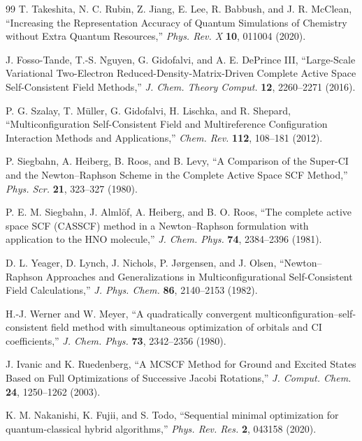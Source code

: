 \documentclass[
 reprint,
 amsmath,amssymb,
 aps,
 physrev,
]{revtex4-2}
\begin{document}
\begin{thebibliography}{99}
    T. Takeshita, N. C. Rubin, Z. Jiang, E. Lee, R. Babbush, and J. R. McClean,
    ``Increasing the Representation Accuracy of Quantum Simulations of Chemistry without Extra Quantum Resources,''
    \textit{Phys. Rev. X} \textbf{10}, 011004 (2020).

    J. Fosso-Tande, T.-S. Nguyen, G. Gidofalvi, and A. E. DePrince III,
    ``Large-Scale Variational Two-Electron Reduced-Density-Matrix-Driven Complete Active Space Self-Consistent Field Methods,''
    \textit{J. Chem. Theory Comput.} \textbf{12}, 2260--2271 (2016).

    P. G. Szalay, T. M{\"u}ller, G. Gidofalvi, H. Lischka, and R. Shepard,
    ``Multiconfiguration Self-Consistent Field and Multireference Configuration Interaction Methods and Applications,''
    \textit{Chem. Rev.} \textbf{112}, 108--181 (2012).

    P. Siegbahn, A. Heiberg, B. Roos, and B. Levy,
    ``A Comparison of the Super-CI and the Newton--Raphson Scheme in the Complete Active Space SCF Method,''
    \textit{Phys. Scr.} \textbf{21}, 323--327 (1980).

    P. E. M. Siegbahn, J. Alml{\"o}f, A. Heiberg, and B. O. Roos,
    ``The complete active space SCF (CASSCF) method in a Newton--Raphson formulation with application to the HNO molecule,''
    \textit{J. Chem. Phys.} \textbf{74}, 2384--2396 (1981).

    D. L. Yeager, D. Lynch, J. Nichols, P. J{\o}rgensen, and J. Olsen,
    ``Newton--Raphson Approaches and Generalizations in Multiconfigurational Self-Consistent Field Calculations,''
    \textit{J. Phys. Chem.} \textbf{86}, 2140--2153 (1982).

    H.-J. Werner and W. Meyer,
    ``A quadratically convergent multiconfiguration--self-consistent field method with simultaneous optimization of orbitals and CI coefficients,''
    \textit{J. Chem. Phys.} \textbf{73}, 2342--2356 (1980).

    J. Ivanic and K. Ruedenberg,
    ``A MCSCF Method for Ground and Excited States Based on Full Optimizations of Successive Jacobi Rotations,''
    \textit{J. Comput. Chem.} \textbf{24}, 1250--1262 (2003).

    K. M. Nakanishi, K. Fujii, and S. Todo, ``Sequential minimal optimization for quantum-classical hybrid algorithms,'' \textit{Phys. Rev. Res.} \textbf{2}, 043158 (2020).


\end{thebibliography}
\end{document}
